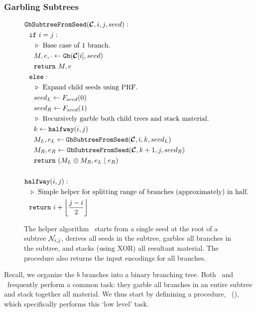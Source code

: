 \subsubsection{Garbling Subtrees}
\begin{figure}
  \begin{align*}
    &\gbtree(\vec{\cir}, i, j, seed):\\
    &~~\cif~i = j:\\
    &~~~~\codecomment{Base case of $1$ branch.}\\
    &~~~~M, e, \cdot \gets \gb(\vec\cir[i], seed)\\
    &~~~~\creturn~M, e\\
    &~~\celse:\\
    &~~~~\codecomment{Expand child seeds using PRF.}\\
    &~~~~seed_L \gets F_{seed}(0)\\
    &~~~~seed_R \gets F_{seed}(1)\\
    &~~~~\codecomment{Recursively garble both child trees and stack
    material.}\\
    &~~~~k \gets \halfway(i, j)\\
    &~~~~M_L, e_L \gets \gbtree(\vec{\cir}, i, k, seed_L)\\
    &~~~~M_R, e_R \gets \gbtree(\vec{\cir}, k + 1, j, seed_R)\\
    &~~~~\creturn~(M_L \oplus M_R, e_L \mid e_R)\\
    \\
    &\halfway(i, j):\\
    &~~\codecomment{Simple helper for splitting range of branches (approximately) in half.}\\
    &~~\creturn~i+\left\lfloor \frac{j-i}{2} \right\rfloor\\
  \end{align*}
  \caption{%
    The helper algorithm \gbtree\ starts from a single seed
    at the root of a subtree $\mathtt{\cal N}_{i,j}$, derives all seeds in the
    subtree, garbles all branches in the subtree, and stacks (using
    XOR) all resultant material. The procedure also returns the input
    encodings for all branches.
  }\label{fig:gbtree}
\end{figure}

Recall, we organize the $b$ branches into a binary branching tree.
Both \evcond\ and \gbcond\ frequently perform a common task:
they garble all branches in an entire subtree and stack together all
material.
%
We thus start by definining a procedure, \gbtree~(),
which specifically performs this `low level' task.

